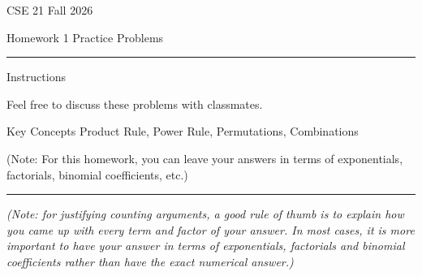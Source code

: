 \documentclass[10pt,letterpaper,unboxed,cm]{article}
\begin{document}
\hfill{CSE 21 Fall 2026}

\hfill{Homework 1 Practice Problems}


\begin{center}
\begin{minipage}[t]{5.7in}
\rule{\linewidth}{2pt}
{\sc Instructions}\newline

Feel free to discuss these problems with classmates.


{\sc Key Concepts} Product Rule, Power Rule, Permutations, Combinations

(Note: For this homework, you can leave your answers in terms of exponentials, factorials, binomial coefficients, etc.)

\rule{\linewidth}{2pt}
\end{minipage} \hfill

\end{center}

\emph{(Note: for justifying counting arguments, a good rule of thumb is to explain how you came up with every term and factor of your answer. In most cases, it is more important to have your answer in terms of exponentials, factorials and binomial coefficients rather than have the exact numerical answer.)}
\end{document}
